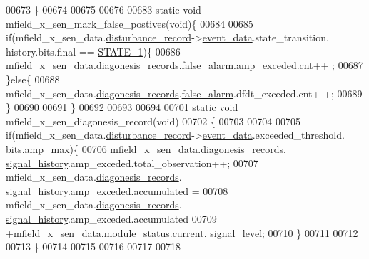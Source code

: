 \begin{DoxyCode}
00673 \}
00674 
00675 
00676 
00683 \textcolor{keyword}{static} \textcolor{keywordtype}{void} mfield\_x\_sen\_mark\_false\_postives(\textcolor{keywordtype}{void})\{
00684 
00685         \textcolor{keywordflow}{if}(mfield\_x\_sen\_data.\hyperlink{a00025_ac9b38e2c1d3f1013a88d33506c754152}{disturbance\_record}->\hyperlink{a00028_a8c0bda69e71ef674e60da47ad0be9ab0}{event\_data}.state\_transition.
      history.bits.final == \hyperlink{a00021_a727351838367f27ac0adb9a13422c342}{STATE\_1})\{
00686             mfield\_x\_sen\_data.\hyperlink{a00025_a2bd79ce84bbd6b7f50d38954f7ae475e}{diagonesis\_records}.\hyperlink{a00019_a55109284fe950025b5d9f3dde60d4553}{false\_alarm}.amp\_exceded.cnt++
      ;
00687         \}\textcolor{keywordflow}{else}\{
00688             mfield\_x\_sen\_data.\hyperlink{a00025_a2bd79ce84bbd6b7f50d38954f7ae475e}{diagonesis\_records}.\hyperlink{a00019_a55109284fe950025b5d9f3dde60d4553}{false\_alarm}.dfdt\_exceded.cnt+
      +;
00689        \}
00690        
00691 \}
00692 
00693 
00694 
00701 \textcolor{keyword}{static} \textcolor{keywordtype}{void} mfield\_x\_sen\_diagonesis\_record(\textcolor{keywordtype}{void})
00702 \{
00703 
00704 
00705         \textcolor{keywordflow}{if}(mfield\_x\_sen\_data.\hyperlink{a00025_ac9b38e2c1d3f1013a88d33506c754152}{disturbance\_record}->\hyperlink{a00028_a8c0bda69e71ef674e60da47ad0be9ab0}{event\_data}.exceeded\_threshold.
      bits.amp\_max)\{
00706                     mfield\_x\_sen\_data.\hyperlink{a00025_a2bd79ce84bbd6b7f50d38954f7ae475e}{diagonesis\_records}.
      \hyperlink{a00019_ab7038f4de1f77b52a7f89e9f77c0b846}{signal\_history}.amp\_exceded.total\_observation++;
00707                     mfield\_x\_sen\_data.\hyperlink{a00025_a2bd79ce84bbd6b7f50d38954f7ae475e}{diagonesis\_records}.
      \hyperlink{a00019_ab7038f4de1f77b52a7f89e9f77c0b846}{signal\_history}.amp\_exceded.accumulated =
00708                     mfield\_x\_sen\_data.\hyperlink{a00025_a2bd79ce84bbd6b7f50d38954f7ae475e}{diagonesis\_records}.
      \hyperlink{a00019_ab7038f4de1f77b52a7f89e9f77c0b846}{signal\_history}.amp\_exceded.accumulated
00709                     +mfield\_x\_sen\_data.\hyperlink{a00025_adfab5a5d8b45a93dfb13edb24e2b80e3}{module\_status}.\hyperlink{a00019_acf41ffc11da291c2f9f0fcb02ee72b98}{current}.
      \hyperlink{a00019_a4070db8eab0ff93e3fbc1df59872f117}{signal\_level};
00710         \}
00711 
00712 
00713 \}
00714 
00715 
00716 
00717 
00718 
\end{DoxyCode}
